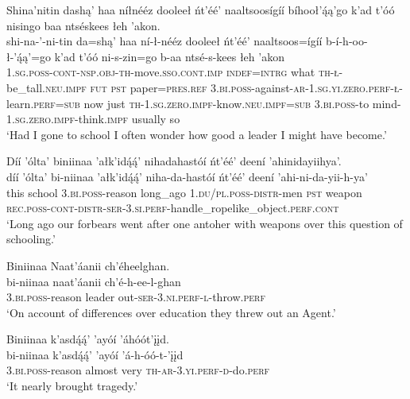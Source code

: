 \ea\label{ex:text3-10-9}
Shina’nitin dashą’ haa níłnééz dooleeł ńt’éé’ naaltsoosígíí bíhooł’ą́ą’go k’ad t’óó nisingo baa ntséskees łeh ’akon.\\
\gll shi-na-’-ni-tin	da=shą’	haa	ní-ł-nééz	dooleeł	ńt’éé’	naaltsoos=ígíí	b-í-h-oo-ł-’ą́ą’=go	k’ad	t’óó	ni-s-zin=go	b-aa	ntsé-s-kees	łeh	’akon\\
     1.\textsc{sg}.\textsc{poss}-\textsc{cont}-\textsc{nsp}.\textsc{obj}-\textsc{th}-move.\textsc{sso}.\textsc{cont}.\textsc{imp}	\textsc{indef}=\textsc{intrg}	what	\textsc{th}-\textsc{ł}-be\_tall.\textsc{neu}.\textsc{impf}	\textsc{fut}	\textsc{pst}	paper=\textsc{pres}.\textsc{ref}	3.\textsc{bi}.\textsc{poss}-against-\textsc{ar}-1.\textsc{sg}.\textsc{yi}.\textsc{zero}.\textsc{perf}-\textsc{ł}-learn.\textsc{perf}=\textsc{sub}	now	just	\textsc{th}-1.\textsc{sg}.\textsc{zero}.\textsc{impf}-know.\textsc{neu}.\textsc{impf}=\textsc{sub}	3.\textsc{bi}.\textsc{poss}-to	mind-1.\textsc{sg}.\textsc{zero}.\textsc{impf}-think.\textsc{impf}	usually	so\\
\glt `Had I gone to school I often wonder how good a leader I might have become.'
\z

\ea\label{ex:text3-11-1}
Díí ’ólta’ biniinaa ’ałk’idą́ą́’ nihadahastóí ńt’éé’ deení ’ahinidayiihya’.\\
\gll díí	’ólta’	bi-niinaa	’ałk’idą́ą́’	niha-da-hastóí	ńt’éé’	deení	’ahi-ni-da-yii-h-ya’\\
     this	school	3.\textsc{bi}.\textsc{poss}-reason	long\_ago	1.\textsc{du}/\textsc{pl}.\textsc{poss}-\textsc{distr}-men	\textsc{pst}	weapon	\textsc{rec}.\textsc{poss}-\textsc{cont}-\textsc{distr}-\textsc{ser}-3.\textsc{si}.\textsc{perf}-handle\_ropelike\_object.\textsc{perf}.\textsc{cont}\\
\glt `Long ago our forbears went after one antoher with weapons over this question of schooling.'
\z

\ea\label{ex:text3-11-2}
Biniinaa Naat’áanii ch’éheelghan.\\
\gll bi-niinaa	naat’áanii	ch’é-h-ee-l-ghan\\
     3.\textsc{bi}.\textsc{poss}-reason	leader	out-\textsc{ser}-3.\textsc{ni}.\textsc{perf}-\textsc{l}-throw.\textsc{perf}\\
\glt `On account of differences over education they threw out an Agent.'
\z

\ea\label{ex:text3-11-3}
Biniinaa k’asdą́ą́’ ’ayóí ’áhóót’įįd.\\
\gll bi-niinaa	k’asdą́ą́’	’ayóí	’á-h-óó-t-’įįd\\
     3.\textsc{bi}.\textsc{poss}-reason	almost	very	\textsc{th}-\textsc{ar}-3.\textsc{yi}.\textsc{perf}-\textsc{d}-do.\textsc{perf}\\
\glt `It nearly brought tragedy.'
\z

